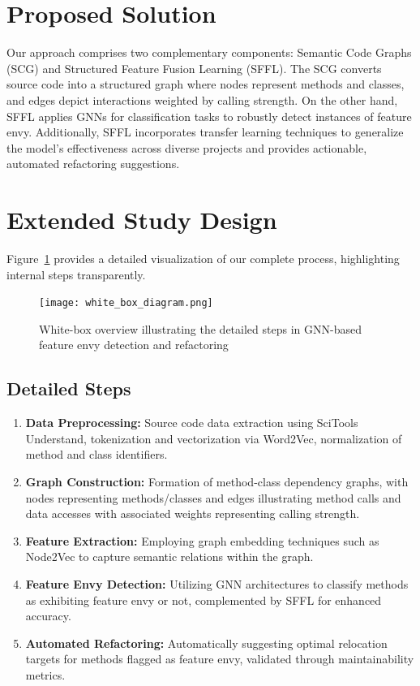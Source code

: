 \documentclass{article}
\begin{document}
\section{Proposed Solution}
Our approach comprises two complementary components: Semantic Code Graphs (SCG) and Structured Feature Fusion Learning (SFFL). The SCG converts source code into a structured graph where nodes represent methods and classes, and edges depict interactions weighted by calling strength. On the other hand, SFFL applies GNNs for classification tasks to robustly detect instances of feature envy. Additionally, SFFL incorporates transfer learning techniques to generalize the model's effectiveness across diverse projects and provides actionable, automated refactoring suggestions.

\section{Extended Study Design}
Figure~\ref{fig:white-box} provides a detailed visualization of our complete process, highlighting internal steps transparently.

\begin{figure}[ht!]
\centering
\texttt{[image: white\_box\_diagram.png]}
\caption{White-box overview illustrating the detailed steps in GNN-based feature envy detection and refactoring}
\label{fig:white-box}
\end{figure}

\subsection{Detailed Steps}
\begin{enumerate}
    \item \textbf{Data Preprocessing:} Source code data extraction using SciTools Understand, tokenization and vectorization via Word2Vec, normalization of method and class identifiers.
    \item \textbf{Graph Construction:} Formation of method-class dependency graphs, with nodes representing methods/classes and edges illustrating method calls and data accesses with associated weights representing calling strength.
    \item \textbf{Feature Extraction:} Employing graph embedding techniques such as Node2Vec to capture semantic relations within the graph.
    \item \textbf{Feature Envy Detection:} Utilizing GNN architectures to classify methods as exhibiting feature envy or not, complemented by SFFL for enhanced accuracy.
    \item \textbf{Automated Refactoring:} Automatically suggesting optimal relocation targets for methods flagged as feature envy, validated through maintainability metrics.
\end{enumerate}
\end{document}
